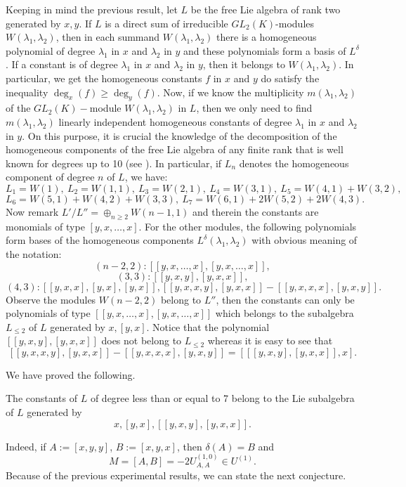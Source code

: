 \documentclass{cimart}
\begin{document}
Keeping in mind the previous result, let $L$ be the free Lie algebra of rank two generated by $x,y$. If $L$ is a direct sum of irreducible $GL_2(K)$-modules $W(\lambda_1,\lambda_2)$, then in each 
summand $W(\lambda_1,\lambda_2)$ there is a homogeneous polynomial of degree $\lambda_1$ in $x$ and $\lambda_2$ in $y$ and these polynomials form a basis of $L^\delta$. If a constant is of degree $\lambda_1$ in $x$ and $\lambda_2$ in $y$, then it belongs to $W(\lambda_1,\lambda_2)$. In particular, we get the homogeneous constants $f$ in $x$ and $y$ do satisfy the 
inequality $\deg_x(f)\geq \deg_y(f)$. Now, if we know the multiplicity $m{(\lambda_1,\lambda_2)}$ of the $GL_2(K)-$module $W(\lambda_1,\lambda_2)$ in $L$, then we only need to find $m{(\lambda_1,\lambda_2)}$ linearly independent homogeneous constants of degree $\lambda_1$ in $x$ and $\lambda_2$ in $y$. On this purpose, it is crucial the knowledge of the decomposition of the homogeneous 
components of the free Lie algebra of any finite rank that is well known for degrees up to 10 (see \cite{Thrall}). In particular, if $L_n$ denotes the homogeneous component of degree $n$ of $L$, we have:
\[L_1=W(1),\ L_2=W(1,1),\ L_3=W(2,1),\ L_4=W(3,1),\ L_5=W(4,1)+W(3,2),\]\[L_6=W(5,1)+W(4,2)+W(3,3),\ L_7=W(6,1)+2W(5,2)+2W(4,3).\]
Now remark $L'/L''=\oplus_{n\geq 2}W(n-1,1)$ and therein the constants are monomials of type $[y,x,\ldots,x]$. For the other modules, the following polynomials form bases of the homogeneous 
components $L^{\delta}(\lambda_1,\lambda_2)$ with obvious meaning of the notation:
\[
(n - 2,2): [[y,x,…,x],[y,x,…,x]],
\]
\[
(3,3): [[y,x,y],[y,x,x]],
\] 
\[
(4,3): [[y,x,x],[y,x],[y,x]], [[y,x,x,y],[y,x,x]] - [[y,x,x,x],[y,x,y]].
\]
Observe the modules $W(n-2,2)$ belong to $L''$, then the constants can only be polynomials of type
$[[y,x,\ldots,x],[y,x,\ldots,x]]$ which belongs to the subalgebra $L_{\leq 2}$ of $L$ generated by $x,[y,x]$. Notice that the polynomial $[[y,x,y],[y,x,x]]$ does not belong to $L_{\leq 2}$ whereas it is easy to see that 
\[[[y,x,x,y],[y,x,x]] - [[y,x,x,x],[y,x,y]] = [[[y,x,y],[y,x,x]],x].\]
 
 We have proved the following.

\begin{theorem}
The constants of $L$ of degree less than or equal to 7 belong to the Lie subalgebra of $L$ generated by \[x,[y,x],[[y,x,y],[y,x,x]].\] 
\end{theorem}

Indeed, if $A:=[x,y,y]$, $B:=[x,y,x]$, then $\delta(A)=B$ and 
\[
M=[A, B]=-2 U_{A, A}^{(1,0)} \in U^{(1)}.
\]
Because of the previous experimental results, we can state the next conjecture.
\end{document}
